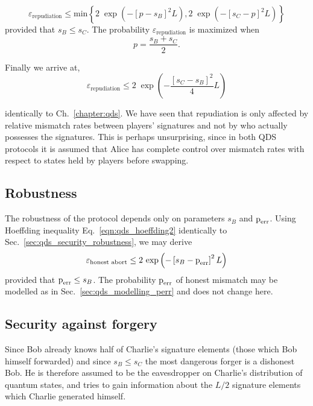 \begin{equation}
\varepsilon_{\text{repudiation}} \le \text{min}\left\{ 2 \; \exp\left(-\left[ p - s_B\right]^2 L\right), 2 \; \exp\left( - \left[ s_C - p\right]^2 L\right) \right\}
\end{equation}
\noindent 
provided that $s_B \le s_C$. The probability $\varepsilon_{\text{repudiation}}$ is maximized when
\begin{equation}
p = \frac{s_B + s_C}{2}.
\end{equation}

\noindent Finally we arrive at,
\begin{equation}\label{eqn:aqc_repudiation}
\varepsilon_{\text{repudiation}} \le 2 \; \exp\left( - \frac{\left[s_C - s_B\right]^2}{4}L\right)
\end{equation}

\noindent identically to Ch.~\ref{chapter:qds}. We have seen that repudiation is only affected by relative mismatch rates between players' signatures and not by who actually possesses the signatures. This is perhaps unsurprising, since in both QDS protocols it is assumed that Alice has complete control over mismatch rates with respect to states held by players before swapping.

\subsection{Robustness}
The robustness of the protocol depends only on parameters $s_B$ and $\text{p}_{\text{err}}$. Using Hoeffding inequality Eq.~\ref{eqn:qds_hoeffding2} identically to Sec.~\ref{sec:qds_security_robustness}, we may derive 
\begin{equation}\label{eqn:aqc_robustness}
\varepsilon_{\text{honest abort}} \le 2 \, \exp\left( - \left[s_B - \text{p}_{\text{err}}\right]^2 L\right)
\end{equation}
provided that $\text{p}_{\text{err}} \le s_B$. The probability $\text{p}_{\text{err}}$ of honest mismatch may be modelled as in Sec.~\ref{sec:qds_modelling_perr} and does not change here.

\subsection{Security against forgery}
Since Bob already knows half of Charlie's signature elements (those which Bob himself forwarded) and since $s_B \le s_C$ the most dangerous forger is a dishonest Bob. He is therefore assumed to be the eavesdropper on Charlie's distribution of quantum states, and tries to gain information about the $L/2$ signature elements which Charlie generated himself.

